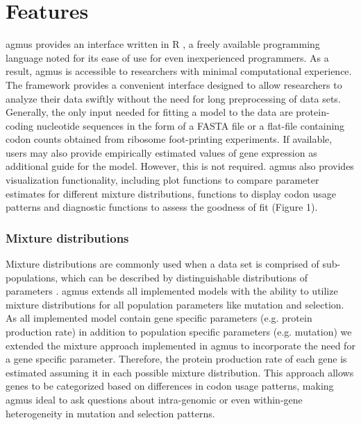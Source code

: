 \documentclass{bioinfo}
\newcommand{\package}{agmus } %
\begin{document}
\section*{Features}
\package provides an interface written in R \citep{rcore}, a freely available programming language noted for its ease of use for even inexperienced programmers. As a result, \package is accessible to researchers with minimal computational experience. The framework provides a convenient interface designed to allow researchers to analyze their data swiftly without the need for long preprocessing of data sets. Generally, the only input needed for fitting a model to the data are protein-coding nucleotide sequences in the form of a FASTA file or a flat-file containing codon counts obtained from ribosome foot-printing experiments. If available, users may also provide empirically estimated values of gene expression as additional guide for the model. However, this is not required.
\package also provides visualization functionality, including plot functions to compare parameter estimates for different mixture distributions, functions to display codon usage patterns and diagnostic functions to assess the goodness of fit (Figure 1).

\subsubsection*{Mixture distributions}
Mixture distributions are commonly used when a data set is comprised of sub-populations, which can be described by distinguishable distributions of parameters \citep{gelman2013}. \package extends all implemented models with the ability to utilize mixture distributions for all population parameters like mutation and selection. As all implemented model contain gene specific parameters (e.g. protein production rate) in addition to population specific parameters (e.g. mutation) we extended the mixture approach implemented in \package to incorporate the need for a gene specific parameter. Therefore, the protein production rate of each gene is estimated assuming it in each possible mixture distribution. This approach allows genes to be categorized based on differences in codon usage patterns, making \package ideal to ask questions about intra-genomic or even within-gene heterogeneity in mutation and selection patterns. 
\end{document}
